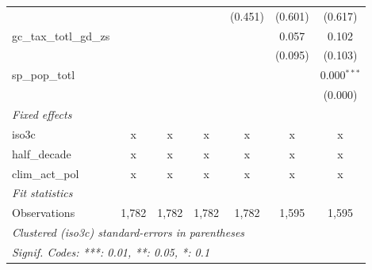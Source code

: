 \begin{tabular}{lcccccc}
                                                      &              &              &               & (0.451)       & (0.601)        & (0.617)\\   
   gc\_tax\_totl\_gd\_zs                              &              &              &               &               & 0.057          & 0.102\\   
                                                      &              &              &               &               & (0.095)        & (0.103)\\   
   sp\_pop\_totl                                      &              &              &               &               &                & 0.000$^{***}$\\   
                                                      &              &              &               &               &                & (0.000)\\   
   \emph{Fixed effects}\\
   iso3c                                              & x            & x            & x             & x             & x              & x\\  
   half\_decade                                       & x            & x            & x             & x             & x              & x\\  
   clim\_act\_pol                                     & x            & x            & x             & x             & x              & x\\  
   \midrule \emph{Fit statistics}\\
   Observations                                       & 1,782        & 1,782        & 1,782         & 1,782         & 1,595          & 1,595\\  
   \midrule
   \multicolumn{7}{l}{\emph{Clustered (iso3c) standard-errors in parentheses}}\\
   \multicolumn{7}{l}{\emph{Signif. Codes: ***: 0.01, **: 0.05, *: 0.1}}\\
\end{tabular}
\par\endgroup


